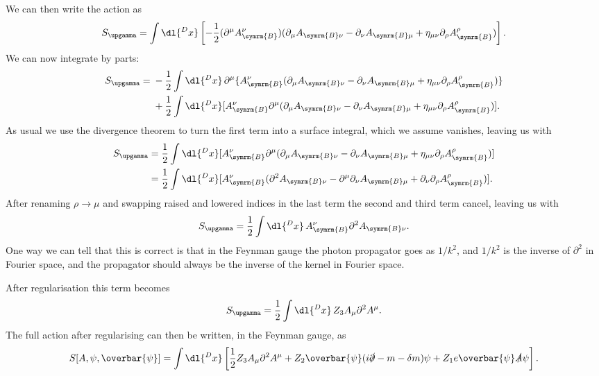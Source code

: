 \documentclass[fleqn]{NotesClass}
\newcommand{\Pphoton}{\ensuremath{\upgamma}}
\newcommand{\diracadjoint}[1]{\overbar{#1}}
\newcommand{\dalembertian}{\partial^2}
\newcommand{\bare}{\symrm{B}}
\newcommand{\minkowskiMetric}{\eta}
\begin{document}
    We can then write the action as
    \begin{equation}
        S_{\Pphoton} = \int \dl{^Dx} \left[ -\frac{1}{2}(\partial^\mu A_{\bare}^\nu)(\partial_\mu A_{\bare \nu} - \partial_\nu A_{\bare \mu} + \minkowskiMetric_{\mu\nu} \partial_\rho A_{\bare}^\rho) \right].
    \end{equation}
    We can now integrate by parts:
    \begin{align}
        S_{\Pphoton} = {} &-\frac{1}{2}\int \dl{^Dx} \, \partial^\mu \{A_{\bare}^\nu(\partial_\mu A_{\bare \nu} - \partial_\nu A_{\bare \mu} + \minkowskiMetric_{\mu\nu} \partial_\rho A_{\bare}^\rho)\} \notag\\
        &+ \frac{1}{2} \int \dl{^Dx} [A_{\bare}^\nu \partial^\mu (\partial_\mu A_{\bare \nu} - \partial_\nu A_{\bare \mu} + \minkowskiMetric_{\mu\nu} \partial_\rho A_{\bare}^\rho)].
    \end{align}
    As usual we use the divergence theorem to turn the first term into a surface integral, which we assume vanishes, leaving us with
    \begin{align}
        S_{\Pphoton} &= \frac{1}{2} \int \dl{^Dx} [A_{\bare}^\nu \partial^\mu (\partial_\mu A_{\bare \nu} - \partial_\nu A_{\bare \mu} + \minkowskiMetric_{\mu\nu} \partial_\rho A_{\bare}^\rho)]\\
        &= \frac{1}{2} \int \dl{^Dx} [A_{\bare}^\nu (\dalembertian A_{\bare \nu} - \partial^\mu \partial_\nu A_{\bare \mu} + \partial_\nu \partial_\rho A_{\bare}^\rho)].
    \end{align}
    After renaming \(\rho \to \mu\) and swapping raised and lowered indices in the last term the second and third term cancel, leaving us with
    \begin{equation}
        S_{\Pphoton} = \frac{1}{2}\int \dl{^Dx} \, A_{\bare}^\nu \dalembertian A_{\bare \nu}.
    \end{equation}
    One way we can tell that this is correct is that in the Feynman gauge the photon propagator goes as \(1/k^2\), and \(1/k^2\) is the inverse of \(\dalembertian\) in Fourier space, and the propagator should always be the inverse of the kernel in Fourier space.
    
    After regularisation this term becomes
    \begin{equation}
        S_{\Pphoton} = \frac{1}{2} \int \dl{^D x} \, Z_3 A_\mu \dalembertian A^\mu.
    \end{equation}
    The full action after regularising can then be written, in the Feynman gauge, as
    \begin{equation}
        S[A, \psi, \diracadjoint{\psi}] = \int \dl{^Dx} \left[ \frac{1}{2}Z_3A_\mu \dalembertian A^\mu + Z_2 \diracadjoint{\psi}(i \slashed{\partial} - m - \delta m)\psi + Z_1 e\diracadjoint{\psi}\slashed{A}\psi \right].
    \end{equation}
    
\end{document}

